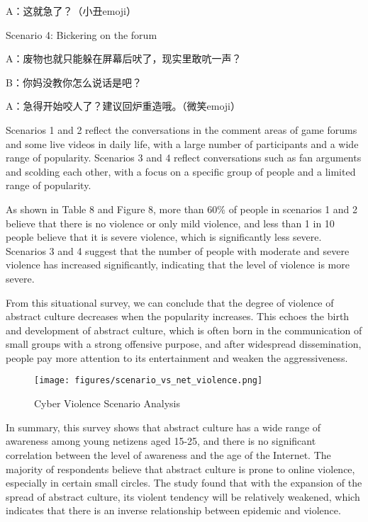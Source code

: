 \documentclass[12pt,a4paper]{ctexart}
\theoremstyle{MyLineTheoremStyle}
\theoremstyle{MyBlockTheoremStyle}
\theoremstyle{MySubsubsectionStyle}
\begin{document}
A：这就急了？（小丑emoji）

Scenario 4: Bickering on the forum

A：废物也就只能躲在屏幕后吠了，现实里敢吭一声？

B：你妈没教你怎么说话是吧？

A：急得开始咬人了？建议回炉重造哦。（微笑emoji）

Scenarios 1 and 2 reflect the conversations in the comment areas of game forums and some live videos in daily life, with a large number of participants and a wide range of popularity. Scenarios 3 and 4 reflect conversations such as fan arguments and scolding each other, with a focus on a specific group of people and a limited range of popularity.

As shown in Table 8 and Figure 8, more than 60\% of people in scenarios 1 and 2 believe that there is no violence or only mild violence, and less than 1 in 10 people believe that it is severe violence, which is significantly less severe. Scenarios 3 and 4 suggest that the number of people with moderate and severe violence has increased significantly, indicating that the level of violence is more severe.

From this situational survey, we can conclude that the degree of violence of abstract culture decreases when the popularity increases. This echoes the birth and development of abstract culture, which is often born in the communication of small groups with a strong offensive purpose, and after widespread dissemination, people pay more attention to its entertainment and weaken the aggressiveness.

\begin{figure}[htbp]
    \centering
    \texttt{[image: figures/scenario\_vs\_net\_violence.png]}
    \caption{Cyber Violence Scenario Analysis}
    \label{fig:scenario_vs_net_violence}
\end{figure}
\newpage

In summary, this survey shows that abstract culture has a wide range of awareness among young netizens aged 15-25, and there is no significant correlation between the level of awareness and the age of the Internet. The majority of respondents believe that abstract culture is prone to online violence, especially in certain small circles. The study found that with the expansion of the spread of abstract culture, its violent tendency will be relatively weakened, which indicates that there is an inverse relationship between epidemic and violence.
\end{document}

